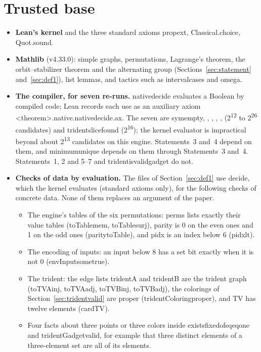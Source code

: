 \documentclass[11pt,a4paper]{article}
\newcommand{\leanus}{\textunderscore\allowbreak}
\newcommand{\lean}[1]{{\ttfamily\let\_\leanus #1}}
\theoremstyle{definition}
\begin{document}
\section{Trusted base}\label{sec:trust}
\begin{itemize}
\item \textbf{Lean's kernel} and the three standard axioms \lean{propext},
\lean{Classical.choice}, \lean{Quot.sound}.
\item \textbf{Mathlib} (v4.33.0): simple graphs, permutations, Lagrange's
theorem, the orbit--stabilizer theorem and the alternating group
(Sections~\ref{sec:statement} and~\ref{sec:def1}), list lemmas, and tactics
such as \lean{interval\_cases} and \lean{omega}.
\item \textbf{The compiler, for seven re-runs.} \lean{native\_decide}
evaluates a Boolean by compiled code; Lean records each use as an auxiliary
axiom \lean{<theorem>.\_native.native\_decide.ax\_1\_1}. The seven are
\lean{sym\_empty\_13}, \lean{\_23}, \lean{\_113}, \lean{\_6}, \lean{\_123},
\lean{\_1113} (2\textsuperscript{12} to 2\textsuperscript{26} candidates) and
\lean{trident\_slice\_found} (2\textsuperscript{16}); the kernel evaluator is
impractical beyond about 2\textsuperscript{13} candidates on this engine.
Statements~3 and~4 depend on them, and \lean{minimum\_unique} depends on
them through Statements~3 and~4. Statements~1, 2 and 5--7 and
\lean{trident\_is\_valid\_gadget} do not.
\item \textbf{Checks of data by evaluation.} The files of
Section~\ref{sec:def1} use \lean{decide}, which the kernel evaluates
(standard axioms only), for the following checks of concrete data. None of
them replaces an argument of the paper.
\begin{itemize}
\item The engine's tables of the six permutations: \lean{perms} lists exactly
their value tables (\lean{toTable\_mem}, \lean{toTable\_surj}), \lean{parity}
is 0 on the even ones and 1 on the odd ones (\lean{parity\_toTable}), and
\lean{pidx} is an index below 6 (\lean{pidx\_lt}).
\item The encoding of inputs: an input below 8 has a set bit exactly when it
is not 0 (\lean{envInput\_some\_true}).
\item The trident: the edge lists \lean{tridentA} and \lean{tridentB} are the
trident graph (\lean{toTVA\_inj}, \lean{toTVA\_adj}, \lean{toTVB\_inj},
\lean{toTVB\_adj}), the colorings of Section~\ref{sec:tridentvalid} are proper
(\lean{tridentColoring\_proper}), and \lean{TV} has twelve elements
(\lean{card\_TV}).
\item Four facts about three points or three colors inside
\lean{exists\_fixed\_of\_sq\_eq\_one} and \lean{tridentGadget\_valid}, for
example that three distinct elements of a three-element set are all of its
elements.
\end{itemize}
\end{itemize}

\end{document}
